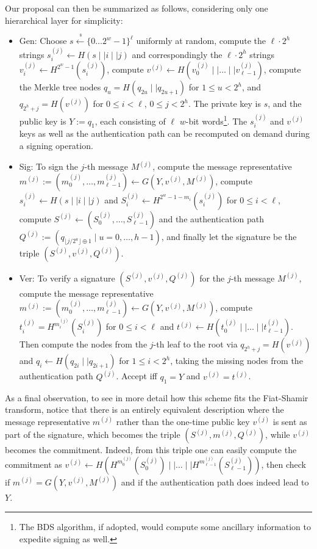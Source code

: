 \documentclass[11pt]{llncs}
\newcommand{\samples}{\stackrel{\;_\$}{\gets}}
\begin{document}
Our proposal can then be summarized as follows, considering only one hierarchical layer for simplicity:

\begin{itemize}
\item \textsf{Gen}: Choose $s \samples \{0 \dots 2^w-1\}^\ell$ uniformly at random, compute the $\ell \cdot 2^h$ strings $s_i^{(j)} \gets H(s \mid\mid i \mid\mid j)$ and correspondingly the $\ell \cdot 2^h$ strings $v_i^{(j)} \gets H^{2^w-1}(s_i^{(j)})$, compute  $v^{(j)} \gets H(v_0^{(j)} \mid\mid \dots \mid\mid v_{\ell-1}^{(j)})$, compute the Merkle tree nodes $q_u = H(q_{2u} \mid\mid q_{2u+1})$ for $1 \leqslant u < 2^h$, and $q_{2^h + j} = H(v^{(j)})$ for $0 \leqslant i < \ell$, $0 \leqslant j < 2^h$. 
The private key is $s$, and the public key is $Y := q_1$, each consisting of $\ell$ $w$-bit words\footnote{The BDS algorithm, if adopted, would compute some ancillary information to expedite signing as well.}. The $s_i^{(j)}$ and $v^{(j)}$ keys as well as the authentication path can be recomputed on demand during a signing operation.
%
\item \textsf{Sig}: To sign the $j$-th message $M^{(j)}$, compute the message representative $m^{(j)} := (m_0^{(j)}, \dots, m_{\ell-1}^{(j)}) \gets G(Y, v^{(j)}, M^{(j)})$, compute $s_i^{(j)} \gets H(s \mid\mid i \mid\mid j)$ and $S_i^{(j)} \gets H^{2^w - 1 - m_i}(s_i^{(j)})$ for $0 \leqslant i < \ell$, compute $S^{(j)} \gets (S_0^{(j)}, \dots, S_{\ell-1}^{(j)})$ and the authentication path $Q^{(j)} := (q_{\lfloor j/2^u \rfloor \oplus 1} \mid u = 0, \dots, h-1)$, and finally let the signature be the triple $(S^{(j)}, v^{(j)}, Q^{(j)})$.
%
\item \textsf{Ver}: To verify a signature $(S^{(j)}, v^{(j)}, Q^{(j)})$ for the $j$-th message $M^{(j)}$, compute the message representative $m^{(j)} := (m_0^{(j)}, \dots, m_{\ell-1}^{(j)}) \gets G(Y, v^{(j)}, M^{(j)})$, compute $t_i^{(j)} = H^{m_i^{(j)}}(S_i^{(j)})$ for $0 \leqslant i < \ell$ and $t^{(j)} \gets H(t_0^{(j)} \mid\mid \dots \mid\mid t_{\ell-1}^{(j)})$. Then compute the nodes from the $j$-th leaf to the root via $q_{2^h + j} = H(v^{(j)})$ and $q_i \gets H(q_{2i} \mid\mid q_{2i+1})$ for $1 \leqslant i < 2^h$, taking the missing nodes from the authentication path $Q^{(j)}$. Accept iff $q_1 = Y$ and $v^{(j)} = t^{(j)}$.
\end{itemize}

As a final observation, to see in more detail how this scheme fits the Fiat-Shamir transform, notice that there is an entirely equivalent description where the message representative $m^{(j)}$ rather than the one-time public key $v^{(j)}$ is sent as part of the signature, which becomes the triple $(S^{(j)}, m^{(j)}, Q^{(j)})$, while $v^{(j)}$ becomes the commitment. Indeed, from this triple one can easily compute the commitment as $v^{(j)} \gets H(H^{m_0^{(j)}}(S_0^{(j)}) \mid\mid \dots \mid\mid H^{m_{\ell-1}^{(j)}}(S_{\ell-1}^{(j)}))$, then check if $m^{(j)} = G(Y, v^{(j)}, M^{(j)})$ and if the authentication path does indeed lead to $Y$.
\end{document}
